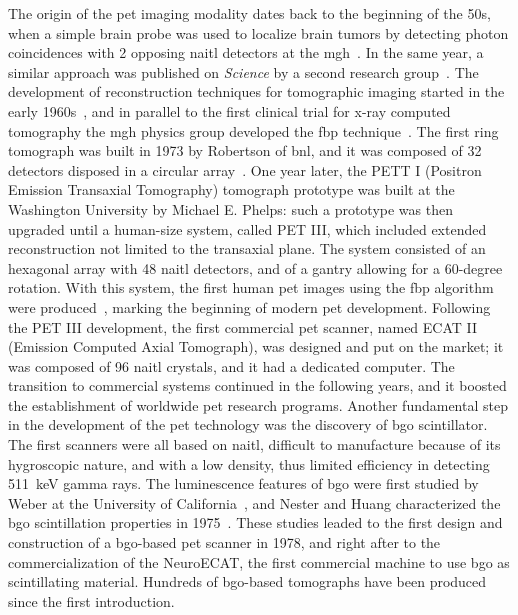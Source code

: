 The origin of the \gls{pet} imaging modality dates back to the beginning of the 50s, when a simple brain probe was used to localize brain tumors by detecting photon coincidences with 2 opposing \gls{naitl} detectors at the \gls{mgh}~\parencite{Sweet1951}. In the same year, a similar approach was published on \textit{Science} by a second research group~\parencite{Wrenn1951}. The development of reconstruction techniques for tomographic imaging started in the early 1960s~\parencite{Kuhl1963}, and in parallel to the first clinical trial for x-ray computed tomography the \gls{mgh} physics group developed the \gls{fbp} technique~\parencite{Chesler1971}. The first ring tomograph was built in 1973 by Robertson of \gls{bnl}, and it was composed of 32 detectors disposed in a circular array~\parencite{Robertson1972}. One year later, the PETT I (Positron Emission Transaxial Tomography) tomograph prototype was built at the Washington University by Michael E. Phelps: such a prototype was then upgraded until a human-size system, called PET III, which included extended reconstruction not limited to the transaxial plane. The system consisted of an hexagonal array with 48 \gls{naitl} detectors, and of a gantry allowing for a 60-degree rotation. With this system, the first human \gls{pet} images using the \gls{fbp} algorithm were produced~\parencite{Hoffmann1976}, marking the beginning of modern \gls{pet} development. Following the PET III development, the first commercial \gls{pet} scanner, named ECAT II (Emission Computed Axial Tomograph), was designed and put on the market; it was composed of 96 \gls{naitl} crystals, and it had a dedicated computer. The transition to commercial systems continued in the following years, and it boosted the establishment of worldwide \gls{pet} research programs. Another fundamental step in the development of the \gls{pet} technology was the discovery of \gls{bgo} scintillator. The first scanners were all based on \gls{naitl}, difficult to manufacture because of its hygroscopic nature, and with a low density, thus limited efficiency in detecting 511~keV gamma rays.  The luminescence features of \gls{bgo} were first studied by Weber at the University of California~\parencite{Weber1973}, and Nester and Huang characterized the \gls{bgo} scintillation properties in 1975~\parencite{Nestor1975}. These studies leaded to the first design and construction of a \gls{bgo}-based \gls{pet} scanner in 1978, and right after to the commercialization of the NeuroECAT, the first commercial machine to use \gls{bgo} as scintillating material. Hundreds of \gls{bgo}-based tomographs have been produced since the first introduction. 
